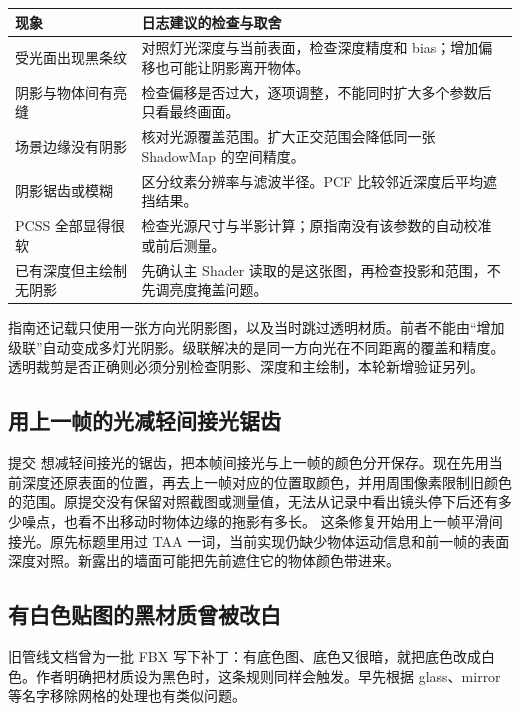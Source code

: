 \noindent\begin{tabularx}{\textwidth}{L{3.3cm}Y}
\toprule
现象 & 日志建议的检查与取舍 \\
\midrule
受光面出现黑条纹 & 对照灯光深度与当前表面，检查深度精度和 bias；增加偏移也可能让阴影离开物体。 \\
阴影与物体间有亮缝 & 检查偏移是否过大，逐项调整，不能同时扩大多个参数后只看最终画面。 \\
场景边缘没有阴影 & 核对光源覆盖范围。扩大正交范围会降低同一张 ShadowMap 的空间精度。 \\
阴影锯齿或模糊 & 区分纹素分辨率与滤波半径。PCF 比较邻近深度后平均遮挡结果。 \\
PCSS 全部显得很软 & 检查光源尺寸与半影计算；原指南没有该参数的自动校准或前后测量。 \\
已有深度但主绘制无阴影 & 先确认主 Shader 读取的是这张图，再检查投影和范围，不先调亮度掩盖问题。 \\
\bottomrule
\end{tabularx}

指南还记载只使用一张方向光阴影图，以及当时跳过透明材质。前者不能由“增加级联”自动变成多灯光阴影。级联解决的是同一方向光在不同距离的覆盖和精度。透明裁剪是否正确则必须分别检查阴影、深度和主绘制，本轮新增验证另列。

\subsection{用上一帧的光减轻间接光锯齿}

提交  想减轻间接光的锯齿，把本帧间接光与上一帧的颜色分开保存。现在先用当前深度还原表面的位置，再去上一帧对应的位置取颜色，并用周围像素限制旧颜色的范围。原提交没有保留对照截图或测量值，无法从记录中看出镜头停下后还有多少噪点，也看不出移动时物体边缘的拖影有多长。
这条修复开始用上一帧平滑间接光。原先标题里用过 TAA 一词，当前实现仍缺少物体运动信息和前一帧的表面深度对照。新露出的墙面可能把先前遮住它的物体颜色带进来。

\subsection{有白色贴图的黑材质曾被改白}
旧管线文档曾为一批 FBX 写下补丁：有底色图、底色又很暗，就把底色改成白色。作者明确把材质设为黑色时，这条规则同样会触发。早先根据 glass、mirror 等名字移除网格的处理也有类似问题。

